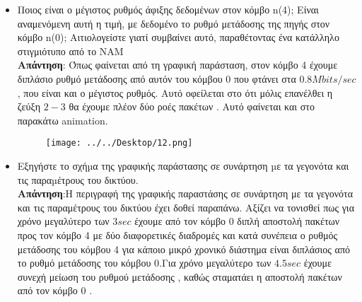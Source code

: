 \documentclass{article}%
\begin{document}
\begin{itemize}
	\item  Ποιος είναι ο μέγιστος ρυθμός άφιξης δεδομένων στον κόμβο n(4); Είναι αναμενόμενη αυτή η τιμή,
με δεδομένο το ρυθμό μετάδοσης της πηγής στον κόμβο n(0); Αιτιολογείστε γιατί συμβαίνει αυτό,
παραθέτοντας ένα κατάλληλο στιγμιότυπο από το NAM\\
	\textbf{Απάντηση}: Όπως φαίνεται από τη γραφική παράσταση, στον κόμβο 4 έχουμε διπλάσιο ρυθμό μετάδοσης από αυτόν του κόμβου 0 που φτάνει στα $0.8 Mbits/sec$, που είναι και ο μέγιστος ρυθμός. Αυτό οφείλεται στο ότι μόλις επανέλθει η ζεύξη $2-3$ θα έχουμε πλέον δύο ροές πακέτων . Αυτό φαίνεται και στο παρακάτω \textlatin{animation}. 
	\begin{figure}[htbp]
		\centering
			\texttt{[image: ../../Desktop/12.png]}
		\label{fig:12}
	\end{figure}
	 \newpage
	\item Εξηγήστε το σχήµα της γραφικής παράστασης σε συνάρτηση µε τα γεγονότα και τις παραµέτρους
του δικτύου. \\
	\textbf{Απάντηση}:H περιγραφή της γραφικής παραστάσης σε συνάρτηση με τα γεγονότα και τις παραμέτρους του δικτύου έχει δοθεί παραπάνω. Αξίζει να τονισθεί πως για χρόνο μεγαλύτερο των $3 sec $ έχουμε από τον κόμβο 0 διπλή αποστολή πακέτων προς τον κόμβο 4 με δύο διαφορετικές διαδρομές και κατά συνέπεια ο ρυθμός μετάδοσης του κόμβου 4 για κάποιο μικρό χρονικό διάστημα είναι διπλάσιος από το ρυθμό μετάδοσης του κόμβου 0.Για χρόνο μεγαλύτερο των $4.5 sec$ έχουμε συνεχή μείωση του ρυθμού μετάδοσης , καθώς σταματάει η αποστολή πακέτων από τον κόμβο 0 .\\

\end{itemize}
\end{document}
